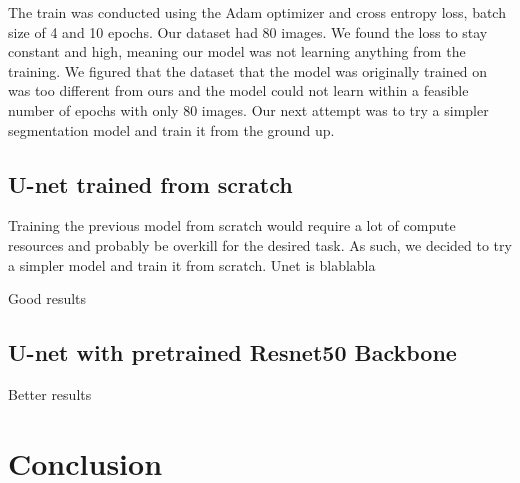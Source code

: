 \documentclass{ieeeaccess}
\begin{document}
The train was conducted using the Adam optimizer and cross entropy loss, batch size of 4 and 10 epochs. Our dataset had 80 images. We
found the loss to stay constant and high, meaning our model was not learning anything from the training. We figured that the dataset
that the model was originally trained on was too different from ours and the model could not learn within a feasible number of epochs
with only 80 images. Our next attempt was to try a simpler segmentation model and train it from the ground up.

\subsection{U-net trained from scratch}

Training the previous model from scratch would require a lot of compute resources and probably be overkill for the desired task. As
such, we decided to try a simpler model and train it from scratch. Unet is blablabla

Good results

\subsection{U-net with pretrained Resnet50 Backbone}

Better results


\section{Conclusion}

  \lipsum[1-2]

\EOD
\end{document}
